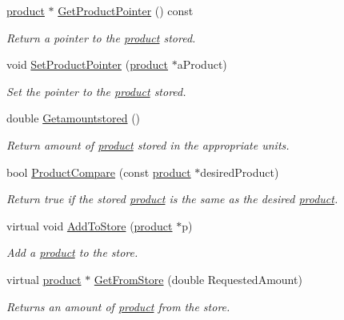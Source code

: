 \begin{DoxyCompactItemize}
\hyperlink{classproduct}{product} $\ast$ \hyperlink{classstorage_a87cffa241a825ff4a09ee71f9d03e04a}{GetProductPointer} () const 
\begin{DoxyCompactList}\small\item\em Return a pointer to the \hyperlink{classproduct}{product} stored. \item\end{DoxyCompactList}\item 
void \hyperlink{classstorage_ad93983f9383bf81f369ed75f2e9fa1d2}{SetProductPointer} (\hyperlink{classproduct}{product} $\ast$aProduct)
\begin{DoxyCompactList}\small\item\em Set the pointer to the \hyperlink{classproduct}{product} stored. \item\end{DoxyCompactList}\item 
double \hyperlink{classstorage_ac5395de0a763ca3db522336339cd6dfb}{Getamountstored} ()
\begin{DoxyCompactList}\small\item\em Return amount of \hyperlink{classproduct}{product} stored in the appropriate units. \item\end{DoxyCompactList}\item 
bool \hyperlink{classstorage_a505dd0940fa02ebab1ebb375bbd83c04}{ProductCompare} (const \hyperlink{classproduct}{product} $\ast$desiredProduct)
\begin{DoxyCompactList}\small\item\em Return true if the stored \hyperlink{classproduct}{product} is the same as the desired \hyperlink{classproduct}{product}. \item\end{DoxyCompactList}\item 
virtual void \hyperlink{classstorage_aafe056e4218e1e93461e8d165dcb13ca}{AddToStore} (\hyperlink{classproduct}{product} $\ast$p)
\begin{DoxyCompactList}\small\item\em Add a \hyperlink{classproduct}{product} to the store. \item\end{DoxyCompactList}\item 
virtual \hyperlink{classproduct}{product} $\ast$ \hyperlink{classstorage_a3ae7258ab926b5fb4771076bedac543a}{GetFromStore} (double RequestedAmount)
\begin{DoxyCompactList}\small\item\em Returns an amount of \hyperlink{classproduct}{product} from the store. \item\end{DoxyCompactList}\item 

\end{DoxyCompactItemize}
